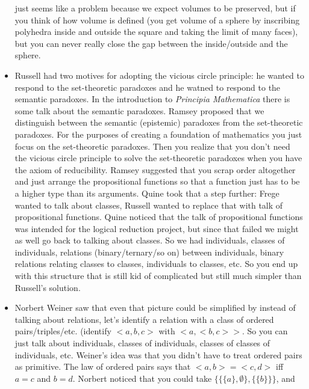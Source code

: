 \documentclass[12pt]{article}
\theoremstyle{definition}
\begin{document}
\begin{itemize}
        just seems like a problem because we expect volumes to be preserved,
        but if you think of how volume is defined (you get volume of a sphere
        by inscribing polyhedra inside and outside the square and taking the
        limit of many faces), but you can never really close the gap between
        the inside/outside and the sphere. 
    \item
        Russell had two motives for adopting the vicious circle principle: he
        wanted to respond to the set-theoretic paradoxes and he watned to
        respond to the semantic paradoxes. In the introduction to
        \textit{Principia Mathematica} there is some talk about the semantic
        paradoxes. Ramsey proposed that we distinguish between the semantic
        (epistemic) paradoxes from the set-theoretic paradoxes. For the
        purposes of creating a foundation of mathematics you just focus on the
        set-theoretic paradoxes. Then you realize that you don't need the
        vicious circle principle to solve the set-theoretic paradoxes when you
        have the axiom of reducibility. Ramsey suggested that you scrap order
        altogether and just arrange the propositional functions so that a
        function just has to be a higher type than its arguments. Quine took
        that a step further: Frege wanted to talk about classes, Russell wanted
        to replace that with talk of propositional functions. Quine noticed
        that the talk of propositional functions was intended for the logical
        reduction project, but since that failed we might as well go back to
        talking about classes. So we had individuals, classes of individuals,
        relations (binary/ternary/so on) between individuals, binary relations
        relating classes to classes, individuals to classes, etc. So you end up
        with this structure that is still kid of complicated but still much
        simpler than Russell's solution.
    \item
        Norbert Weiner saw that even that picture could be simplified by
        instead of talking about relations, let's identify a relation with a
        class of ordered pairs/triples/etc. (identify $<a, b, c>$ with $<a, <b,
        c>>$. So you can just talk about individuals, classes of individuals,
        classes of classes of individuals, etc. Weiner's idea was that you
        didn't have to treat ordered pairs as primitive. The law of ordered
        pairs says that $<a, b> = <c, d>$ iff $a = c$ and $b = d$. Norbert
        noticed that you could take $\{\{\{a\}, \emptyset\} , \{\{b\}\}\}$, and

\end{itemize}
\end{document}

